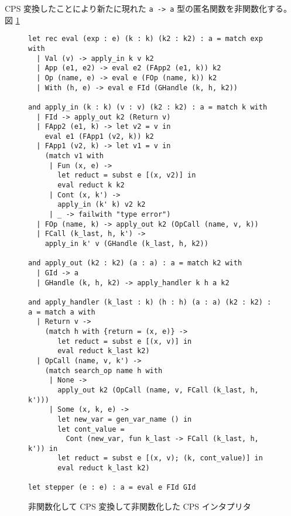 CPS 変換したことにより新たに現れた \texttt{a -> a} 型の匿名関数を非関数化する。図 \ref{figure:4defun}

\begin{figure}
\begin{verbatim}
let rec eval (exp : e) (k : k) (k2 : k2) : a = match exp with
  | Val (v) -> apply_in k v k2
  | App (e1, e2) -> eval e2 (FApp2 (e1, k)) k2
  | Op (name, e) -> eval e (FOp (name, k)) k2
  | With (h, e) -> eval e FId (GHandle (k, h, k2))

and apply_in (k : k) (v : v) (k2 : k2) : a = match k with
  | FId -> apply_out k2 (Return v)
  | FApp2 (e1, k) -> let v2 = v in
    eval e1 (FApp1 (v2, k)) k2
  | FApp1 (v2, k) -> let v1 = v in
    (match v1 with
     | Fun (x, e) ->
       let reduct = subst e [(x, v2)] in
       eval reduct k k2
     | Cont (x, k') ->
       apply_in (k' k) v2 k2
     | _ -> failwith "type error")
  | FOp (name, k) -> apply_out k2 (OpCall (name, v, k))
  | FCall (k_last, h, k') ->
    apply_in k' v (GHandle (k_last, h, k2))

and apply_out (k2 : k2) (a : a) : a = match k2 with
  | GId -> a
  | GHandle (k, h, k2) -> apply_handler k h a k2

and apply_handler (k_last : k) (h : h) (a : a) (k2 : k2) : a = match a with
  | Return v ->
    (match h with {return = (x, e)} ->
       let reduct = subst e [(x, v)] in
       eval reduct k_last k2)
  | OpCall (name, v, k') ->
    (match search_op name h with
     | None ->
       apply_out k2 (OpCall (name, v, FCall (k_last, h, k')))
     | Some (x, k, e) ->
       let new_var = gen_var_name () in
       let cont_value =
         Cont (new_var, fun k_last -> FCall (k_last, h, k')) in
       let reduct = subst e [(x, v); (k, cont_value)] in
       eval reduct k_last k2)

let stepper (e : e) : a = eval e FId GId
\end{verbatim}
\caption{非関数化して CPS 変換して非関数化した CPS インタプリタ}
\label{figure:4defun}
\end{figure}
 
